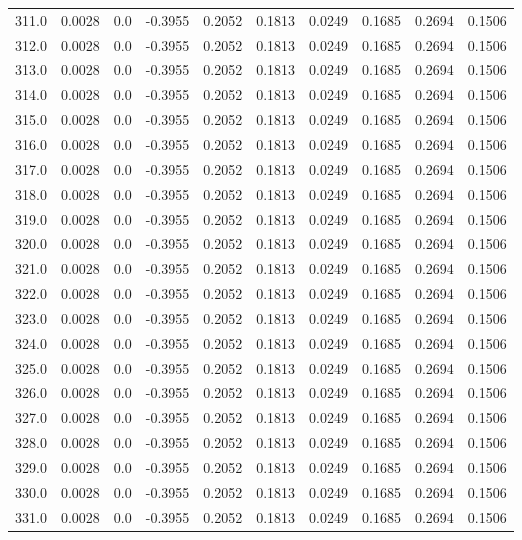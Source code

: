 \begin{longtable}{lrrrrrrrrr}
311.0 & 0.0028 & 0.0 & -0.3955 & 0.2052 & 0.1813 & 0.0249 & 0.1685 & 0.2694 & 0.1506 \\
312.0 & 0.0028 & 0.0 & -0.3955 & 0.2052 & 0.1813 & 0.0249 & 0.1685 & 0.2694 & 0.1506 \\
313.0 & 0.0028 & 0.0 & -0.3955 & 0.2052 & 0.1813 & 0.0249 & 0.1685 & 0.2694 & 0.1506 \\
314.0 & 0.0028 & 0.0 & -0.3955 & 0.2052 & 0.1813 & 0.0249 & 0.1685 & 0.2694 & 0.1506 \\
315.0 & 0.0028 & 0.0 & -0.3955 & 0.2052 & 0.1813 & 0.0249 & 0.1685 & 0.2694 & 0.1506 \\
316.0 & 0.0028 & 0.0 & -0.3955 & 0.2052 & 0.1813 & 0.0249 & 0.1685 & 0.2694 & 0.1506 \\
317.0 & 0.0028 & 0.0 & -0.3955 & 0.2052 & 0.1813 & 0.0249 & 0.1685 & 0.2694 & 0.1506 \\
318.0 & 0.0028 & 0.0 & -0.3955 & 0.2052 & 0.1813 & 0.0249 & 0.1685 & 0.2694 & 0.1506 \\
319.0 & 0.0028 & 0.0 & -0.3955 & 0.2052 & 0.1813 & 0.0249 & 0.1685 & 0.2694 & 0.1506 \\
320.0 & 0.0028 & 0.0 & -0.3955 & 0.2052 & 0.1813 & 0.0249 & 0.1685 & 0.2694 & 0.1506 \\
321.0 & 0.0028 & 0.0 & -0.3955 & 0.2052 & 0.1813 & 0.0249 & 0.1685 & 0.2694 & 0.1506 \\
322.0 & 0.0028 & 0.0 & -0.3955 & 0.2052 & 0.1813 & 0.0249 & 0.1685 & 0.2694 & 0.1506 \\
323.0 & 0.0028 & 0.0 & -0.3955 & 0.2052 & 0.1813 & 0.0249 & 0.1685 & 0.2694 & 0.1506 \\
324.0 & 0.0028 & 0.0 & -0.3955 & 0.2052 & 0.1813 & 0.0249 & 0.1685 & 0.2694 & 0.1506 \\
325.0 & 0.0028 & 0.0 & -0.3955 & 0.2052 & 0.1813 & 0.0249 & 0.1685 & 0.2694 & 0.1506 \\
326.0 & 0.0028 & 0.0 & -0.3955 & 0.2052 & 0.1813 & 0.0249 & 0.1685 & 0.2694 & 0.1506 \\
327.0 & 0.0028 & 0.0 & -0.3955 & 0.2052 & 0.1813 & 0.0249 & 0.1685 & 0.2694 & 0.1506 \\
328.0 & 0.0028 & 0.0 & -0.3955 & 0.2052 & 0.1813 & 0.0249 & 0.1685 & 0.2694 & 0.1506 \\
329.0 & 0.0028 & 0.0 & -0.3955 & 0.2052 & 0.1813 & 0.0249 & 0.1685 & 0.2694 & 0.1506 \\
330.0 & 0.0028 & 0.0 & -0.3955 & 0.2052 & 0.1813 & 0.0249 & 0.1685 & 0.2694 & 0.1506 \\
331.0 & 0.0028 & 0.0 & -0.3955 & 0.2052 & 0.1813 & 0.0249 & 0.1685 & 0.2694 & 0.1506 \\

\end{longtable}
